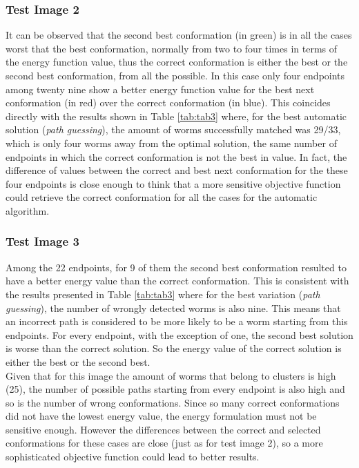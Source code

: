\subsubsection*{Test Image 2}


It can be observed that the second best conformation (in green) is in all 
the cases worst that the best conformation, normally from two to four times 
in terms of the energy function value, thus the correct conformation is 
either the best or the second best conformation, from all the possible.
In this case only four endpoints among twenty nine show a better energy
function value for the best next conformation (in red) over the correct 
conformation (in blue). This coincides directly with the results shown
in Table \ref{tab:tab3} where, for the best automatic solution (\emph{path guessing}),
the amount of worms successfully matched was 29/33, which is only four worms
away from the optimal solution, the same number of endpoints in which the
correct conformation is not the best in value. In fact, the difference of 
values between the correct and best next conformation for the these four
endpoints is close enough to think that a more sensitive objective function
could retrieve the correct conformation for all the cases for the automatic
algorithm.\\ 

\subsubsection*{Test Image 3}

Among the 22 endpoints, for 9
of them the second best conformation resulted to have a better energy value
than the correct conformation. This is consistent with the results presented
in Table \ref{tab:tab3} where for the best variation (\emph{path guessing}), the
number of wrongly detected worms is also nine. This means that an incorrect 
path is considered to be more likely to be a worm starting from this
endpoints. For every endpoint, with the exception of one, the second best 
solution is worse than the correct solution. So the energy value of the 
correct solution is either the best or the second best.\\

Given that for this image the amount of worms that belong to clusters
is high (25), the number of possible paths starting
from every endpoint is also high and so is the number of wrong conformations.
Since so many correct conformations did not have the lowest energy value,
the energy formulation must not be sensitive enough. However
the differences between the correct and selected conformations for
these cases are close (just as for test image 2), so a more sophisticated objective function could lead
to better results.\\
